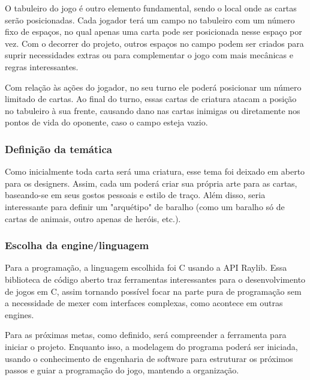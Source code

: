 O tabuleiro do jogo é outro elemento fundamental, sendo o local onde as cartas serão posicionadas. Cada jogador terá um campo no tabuleiro com um número fixo de espaços, no qual apenas uma carta pode ser posicionada nesse espaço por vez. Com o decorrer do projeto, outros espaços no campo podem ser criados para suprir necessidades extras ou para complementar o jogo com mais mecânicas e regras interessantes. 

Com relação às ações do jogador, no seu turno ele poderá posicionar um número limitado de cartas. Ao final do turno, essas cartas de criatura atacam a posição no tabuleiro à sua frente, causando dano nas cartas inimigas ou diretamente nos pontos de vida do oponente, caso o campo esteja vazio.

\subsubsection{Definição da temática}
Como inicialmente toda carta será uma criatura, esse tema foi deixado em aberto para os designers. Assim, cada um poderá criar sua própria arte para as cartas, baseando-se em seus gostos pessoais e estilo de traço. Além disso, seria interessante para definir um "arquétipo" de baralho (como um baralho só de cartas de animais, outro apenas de heróis, etc.).

\subsubsection{Escolha da engine/linguagem}
Para a programação, a linguagem escolhida foi C usando a API Raylib. Essa biblioteca de código aberto traz ferramentas interessantes para o desenvolvimento de jogos em C, assim tornando possível focar na parte pura de programação sem a necessidade de mexer com interfaces complexas, como acontece em outras engines. 

Para as próximas metas, como definido, será compreender a ferramenta para iniciar o projeto. Enquanto isso, a modelagem do programa poderá ser iniciada, usando o conhecimento de engenharia de software para estruturar os próximos passos e guiar a programação do jogo, mantendo a organização.
